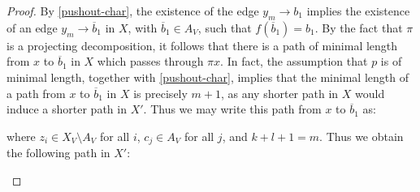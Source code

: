 \documentclass[11pt]{article}
\theoremstyle{definition}
\numberwithin{equation}{section}
\begin{document}
\begin{proof}
By \cref{pushout-char}, the existence of the edge $y_m \to b_1$ implies the existence of an edge $y_m \to \overline{b}_1$ in $X$, with $\overline{b}_1 \in A_V$, such that $f(\overline{b}_1) = b_1$. By the fact that $\pi$ is a projecting decomposition, it follows that there is a path of minimal length from $x$ to $\overline{b}_1$ in $X$ which passes through $\pi x$. In fact, the assumption that $p$ is of minimal length, together with \cref{pushout-char}, implies that the minimal length of a path from $x$ to $\overline{b}_1$ in $X$ is precisely $m+1$, as any shorter path in $X$ would induce a shorter path in $X'$. Thus we may write this path from $x$ to $\overline{b}_1$ as:

\begin{figure}[H]
    \centering
\end{figure}

where $z_i \in X_V \setminus A_V$ for all $i$, $c_j \in A_V$ for all $j$, and $k+l+1 = m$. Thus we obtain the following path in $X'$:

\begin{figure}[H]
    \centering
\end{figure}
\end{proof}
\end{document}
